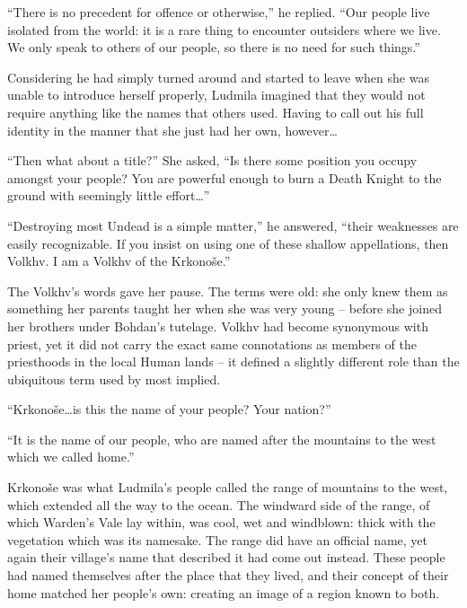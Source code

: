  

“There is no precedent for offence or otherwise,” he replied. “Our people live isolated from the world: it is a rare thing to encounter outsiders where we live. We only speak to others of our people, so there is no need for such things.”

 

Considering he had simply turned around and started to leave when she was unable to introduce herself properly, Ludmila imagined that they would not require anything like the names that others used. Having to call out his full identity in the manner that she just had her own, however…

 

“Then what about a title?” She asked, “Is there some position you occupy amongst your people? You are powerful enough to burn a Death Knight to the ground with seemingly little effort…”

 

“Destroying most Undead is a simple matter,” he answered, “their weaknesses are easily recognizable. If you insist on using one of these shallow appellations, then Volkhv. I am a Volkhv of the Krkonoše.”

 

The Volkhv’s words gave her pause. The terms were old: she only knew them as something her parents taught her when she was very young – before she joined her brothers under Bohdan’s tutelage. Volkhv had become synonymous with priest, yet it did not carry the exact same connotations as members of the priesthoods in the local Human lands – it defined a slightly different role than the ubiquitous term used by most implied.

 

“Krkonoše…is this the name of your people? Your nation?”

 

“It is the name of our people, who are named after the mountains to the west which we called home.”

 

Krkonoše was what Ludmila’s people called the range of mountains to the west, which extended all the way to the ocean. The windward side of the range, of which Warden’s Vale lay within, was cool, wet and windblown: thick with the vegetation which was its namesake. The range did have an official name, yet again their village’s name that described it had come out instead. These people had named themselves after the place that they lived, and their concept of their home matched her people’s own: creating an image of a region known to both.

